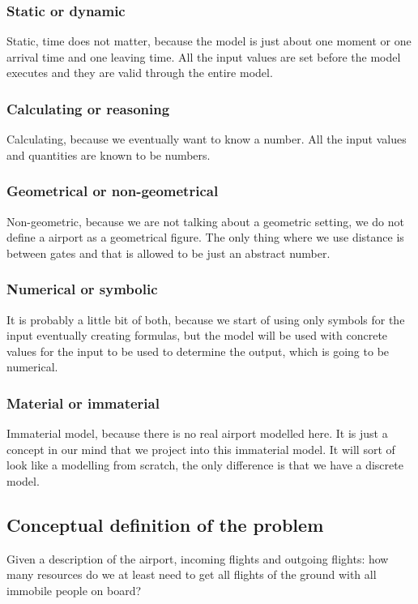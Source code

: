 \documentclass[a4paper, 12pt, notitlepage]{report}
\begin{document}
\subsubsection{Static or dynamic}
Static, time does not matter, because the model is just about one moment or one arrival time and one leaving time. All the input values are set before the model executes and they are valid through the entire model.
\subsubsection{Calculating or reasoning}
Calculating, because we eventually want to know a number. All the input values and quantities are known to be numbers.
\subsubsection{Geometrical or non-geometrical}
 Non-geometric, because we are not talking about a geometric setting, we do not define a airport as a geometrical figure. The only thing where we use distance is between gates and that is  allowed to be just an abstract number.
\subsubsection{Numerical or symbolic}
It is probably a little bit of both, because we start of using only symbols for the input eventually creating formulas, but the model will be used with concrete values for the input to be used to determine the output, which is going to be numerical.
\subsubsection{Material or immaterial}
Immaterial model, because there is no real airport modelled here. It is just a concept in our mind that we project into this immaterial model. It will sort of look like a modelling from scratch, the only difference is that we have a discrete model.

\subsection{Conceptual definition of the problem}
Given a description of the airport, incoming flights and outgoing flights: how many resources do we at least need to get all flights of the ground with all immobile people on board?
\end{document}
